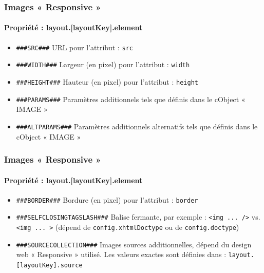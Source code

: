 
\begin{frame}[fragile]
	\frametitle{Images « Responsive »}
	\framesubtitle{Propriété : layout.[layoutKey].element}

	\begin{itemize}
		\item \lstinline!###SRC###!\newline
			URL pour l'attribut : \texttt{src}

		\item \lstinline!###WIDTH###!\newline
			Largeur (en pixel) pour l'attribut : \texttt{width}

		\item \lstinline!###HEIGHT###!\newline
			Hauteur (en pixel) pour l'attribut : \texttt{height}

		\item \lstinline!###PARAMS###!\newline
			Paramètres additionnels tels que définis dans le cObject « IMAGE »

		\item \lstinline!###ALTPARAMS###!\newline
			Paramètres additionnels alternatifs tels que définis dans le cObject « IMAGE »
	\end{itemize}

\end{frame}


\begin{frame}[fragile]
	\frametitle{Images « Responsive »}
	\framesubtitle{Propriété : layout.[layoutKey].element}

	\begin{itemize}
		\item \lstinline!###BORDER###!\newline
			Bordure (en pixel) pour l'attribut : \texttt{border}

		\item \lstinline!###SELFCLOSINGTAGSLASH###!\newline
			Balise fermante, par exemple : \texttt{<img ... />} vs. \texttt{<img ... >}\newline
			(dépend de \texttt{config.xhtmlDoctype} ou de \texttt{config.doctype})

		\item \lstinline!###SOURCECOLLECTION###!\newline
			Images sources additionnelles, dépend du design web « Responsive » utilisé.
			Les valeurs exactes sont définies dans : \texttt{layout.[layoutKey].source}
	\end{itemize}

\end{frame}

